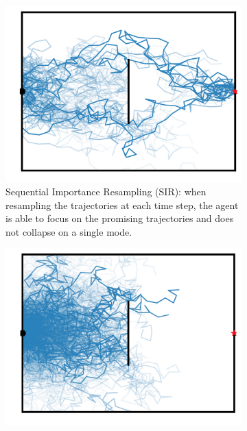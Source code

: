 \begin{figure}
    \begin{subfigure}[t]{.295\textwidth}
\centering
\includegraphics[width=\linewidth, trim={1.1cm 0cm .5cm 0cm},clip]{articles/smcp/figures/smc_resampling_true.png}
\caption{Sequential Importance Resampling (SIR): when resampling the trajectories at each time step, the agent is able to focus on the promising trajectories and does not collapse on a single mode.}
\label{fig:toy_sir}
\end{subfigure}\hspace{0.05\linewidth}
\begin{subfigure}[t]{.295\textwidth}
\centering
\includegraphics[width=\linewidth, trim={1.1cm 0cm .5cm 0cm},clip]{articles/smcp/figures/smc_resampling_false.png}

\end{subfigure}
\end{figure}
